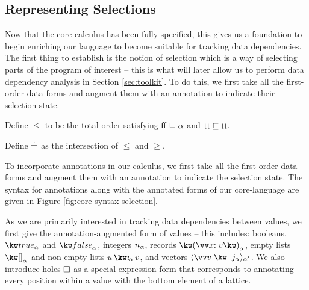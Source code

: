 
\subsection{Representing Selections}
\label{sec:core-language:selections}

Now that the core calculus has been fully specified, this gives us a foundation to begin enriching our language to become suitable for tracking data dependencies. The first thing to establish is the notion of selection which is a way of selecting parts of the program of interest -- this is what will later allow us to perform data dependency analysis in Section \ref{sec:toolkit}. To do this, we first take all the first-order data forms and augment them with an annotation to indicate their selection state.





\begin{definition}
   Define $\leq$ to be the total order satisfying $\mathsf{ff} \sqsubseteq \alpha$ and $\mathsf{tt} \sqsubseteq \mathsf{tt}$.
\end{definition}

\begin{definition}
   Define $\doteq$ as the intersection of $\leq$ and $\geq$.
\end{definition}





\noindent
To incorporate annotations in our calculus, we first take all the first-order data forms and augment them with an annotation to indicate the selection state. The syntax for annotations along with the annotated forms of our core-language are given in Figure \ref{fig:core-syntax-selection}. 

As we are primarily interested in tracking data dependencies between values, we first give the annotation-augmented form of values -- this includes: booleans, $\annTrue{\alpha}$ and $\annFalse{\alpha}$, integers $n_{\alpha}$, records $\annRec{\vec{\bind{x}{v}}}{\alpha}$, empty lists $\annNil{\alpha}$ and non-empty lists $\annCons{u}{v}{\alpha}$, and vectors $\annVecVal{\vec{v}}{\annInt{j}{\alpha}}{\smash{\alpha'}}$. We also introduce holes $\square$ as a special expression form that corresponds to annotating every position within a value with the bottom element of a lattice.

